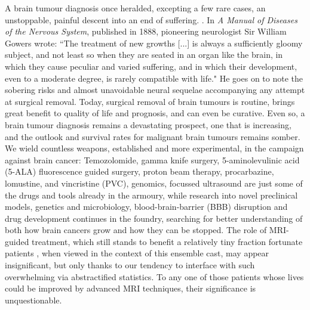 A brain tumour diagnosis once heralded, excepting a few rare cases, an unstoppable, painful descent into an end of suffering. .
In \textit{A Manual of Diseases of the Nervous System}, published in 1888, pioneering neurologist Sir William Gowers wrote:
``The treatment of new growths [...] is always a sufficiently gloomy subject, and not least so when they are seated in an organ like the brain, in which they cause peculiar and varied suffering, and in which their development, even to a moderate degree, is rarely compatible with life."
He goes on to note the sobering risks and almost unavoidable neural sequelae accompanying any attempt at surgical removal.
Today, surgical removal of brain tumours is routine, brings great benefit to quality of life and prognosis, and can even be curative.
Even so, a brain tumour diagnosis remains a devastating prospect, one that is increasing, and the outlook and survival rates for malignant brain tumours remains somber.\autocite{Aldape2019}
We wield countless weapons, established and more experimental, in the campaign against brain cancer:
Temozolomide, gamma knife surgery, 5-aminolevulinic acid (5-ALA) fluorescence guided surgery, proton beam therapy, procarbazine, lomustine, and vincristine (PVC), genomics, focussed ultrasound are just some of the drugs and tools already in the armoury, while research into novel preclinical models, genetics and microbiology, blood-brain-barrier (BBB) disruption and drug development continues in the foundry, searching for better understanding of both how brain cancers grow and how they can be stopped.
The role of MRI-guided treatment, which still stands to benefit a relatively tiny fraction fortunate patients , when viewed in the context of this ensemble cast, may appear insignificant, but only thanks to our tendency to interface with such overwhelming  via abstractified statistics.
To any one of those patients whose lives could be improved by advanced MRI techniques, their significance is unquestionable.

